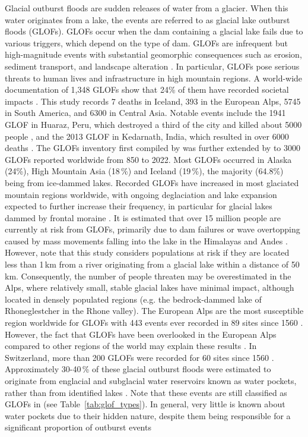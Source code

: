 Glacial outburst floods are sudden releases of water from a glacier. When this water originates from a lake, the events are referred to as glacial lake outburst floods (GLOFs). GLOFs occur when the dam containing a glacial lake fails due to various triggers, which depend on the type of dam. GLOFs are infrequent but high-magnitude events with substantial geomorphic consequences such as erosion, sediment transport, and landscape alteration \citep[e.g.][]{Cook&al2018}. In particular, GLOFs pose serious threats to human lives and infrastructure in high mountain regions. A world-wide documentation of 1,348 GLOFs show that 24\% of them have recorded societal impacts \citep{Carrivick&Tweed2016}. This study records 7 deaths in Iceland, 393 in the European Alps, 5745 in South America, and 6300 in Central Asia. Notable events include the 1941 GLOF in Huaraz, Peru, which destroyed a third of the city and killed about 5000 people \citep{Carey2005}, and the 2013 GLOF in Kedarnath, India, which resulted in over 6000 deaths \citep{Allen&al2016}. The GLOFs inventory first compiled by \cite{Carrivick&Tweed2016} was further extended by \cite{Emmer&al2022, Veh&al2022, Lutzow&al2023} to 3000 GLOFs reported worldwide from 850 to 2022. Most GLOFs occurred in Alaska (24\%), High Mountain Asia (18\,\%) and Iceland (19\,\%), the majority (64.8\%) being from ice-dammed lakes. Recorded GLOFs have increased in most glaciated mountain regions worldwide, with ongoing deglaciation and lake expansion expected to further increase their frequency, in particular for glacial lakes dammed by frontal moraine \citep{Harrison&al2018,Zhang&al2024}. It is estimated that over 15 million people are currently at risk from GLOFs, primarily due to dam failures or wave overtopping caused by mass movements falling into the lake in the Himalayas and Andes \citep{Taylor&al2023}. However, note that this study considers populations at risk if they are located less than 1\,km from a river originating from a glacial lake within a distance of 50\,km. Consequently, the number of people threaten may be overestimated in the Alps, where relatively small, stable glacial lakes have minimal impact, although located in densely populated regions (e.g. the bedrock-dammed lake of Rhoneglestcher in the Rhone valley). The European Alps are the most susceptible region worldwide for GLOFs with 443 events ever recorded in 89 sites since 1560 \citep{Carrivick&Tweed2016,Lutzow&al2023}. However, the fact that GLOFs have been overlooked in the European Alps compared to other regions of the world may explain these results \citep{Veh&al2022}. In Switzerland, more than 200 GLOFs were recorded for 60 sites since 1560 \cite{Carrivick&Tweed2016}. Approximately 30-40\,\% of these glacial outburst floods were estimated to originate from englacial and subglacial water reservoirs known as water pockets, rather than from identified lakes \citep{Haeberli1983}. Note that these events are still classified as GLOFs in \citep{Lutzow&al2023, Zhang&al2024} (see Table~\ref{tab:glof_types}). In general, very little is known about water pockets due to their hidden nature, despite them being responsible for a significant proportion of outburst events 

